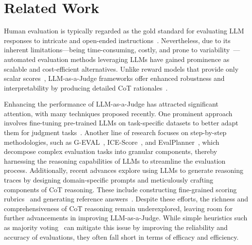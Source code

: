 \section{Related Work}
\label{sec:related}
Human evaluation is typically regarded as the gold standard for evaluating LLM responses to intricate and open-ended instructions~\cite{chiang2023human, elangovan2024human}.
Nevertheless, due to its inherent limitations—being time-consuming, costly, and prone to variability~\cite{karpinska2021the}—automated evaluation methods leveraging LLMs have gained prominence as scalable and cost-efficient alternatives.
Unlike reward models that provide only scalar scores~\cite{wang2024direct,wang2024selftaughtevaluators}, LLM-as-a-Judge frameworks offer enhanced robustness and interpretability by producing detailed CoT rationales~\cite{li2024leveraginglargelanguagemodels,gao2024llmbasednlgevaluationcurrent}.

Enhancing the performance of LLM-as-a-Judge has attracted significant attention, with many techniques proposed recently.
One prominent approach involves fine-tuning pre-trained LLMs on task-specific datasets to better adapt them for judgment tasks~\cite{vu2024foundational, li2024generative, wang2024pandalm, kim2024prometheus2opensource}.
Another line of research focuses on step-by-step methodologies, such as G-EVAL~\cite{liu2023geval}, ICE-Score~\cite{zhuo2024icescore}, and EvalPlanner~\cite{saha2025learningplanreason}, which decompose complex evaluation tasks into granular components, thereby harnessing the reasoning capabilities of LLMs to streamline the evaluation process.
Additionally, recent advances explore using LLMs to generate reasoning traces by designing domain-specific prompts and meticulously crafting components of CoT reasoning.
These include constructing fine-grained scoring rubrics~\cite{zheng2023mtbench, zeng2024llmbar, trivedi2024self} and generating reference answers~\cite{zhang2025reviseval}.
Despite these efforts, the richness and comprehensiveness of CoT reasoning remain underexplored, leaving room for further advancements in improving LLM-as-a-Judge.
While simple heuristics such as majority voting~\cite{badshah2024vote, verga2024vote} can mitigate this issue by improving the reliability and accuracy of evaluations, they often fall short in terms of efficacy and efficiency.